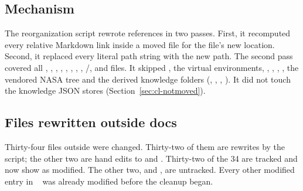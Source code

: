 \subsection{Mechanism}
The reorganization script rewrote references in two passes. First, it recomputed every relative Markdown link inside a moved  file for the file's new location. Second, it replaced every literal  path string with the new path. The second pass covered all , , , , , , , , /,  and  files. It skipped , the virtual environments, , , , , the vendored NASA tree and the derived knowledge folders (, , , ). It did not touch the knowledge JSON stores (Section~\ref{sec:cl-notmoved}).

\subsection{Files rewritten outside docs}
Thirty-four files outside  were changed. Thirty-two of them are rewrites by the script; the other two are hand edits to  and . Thirty-two of the 34 are tracked and now show as modified. The other two,  and , are untracked. Every other modified entry in ~ was already modified before the cleanup began.

